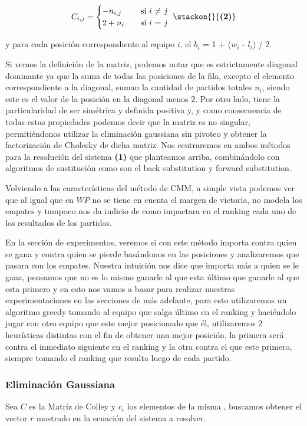 \[ C_{i,j} =
    \begin{cases}
        -n_{i,j}       & \quad \text{si }  \text{$i$ $\neq$ $j$} \\
        2+n_i & \quad \text{si } \text{$i$ $=$ $j$ }\\
    \end{cases}\hfill \stackon{}{\textbf{(2)}}
$$
  $$  \]
                    
y para cada posición correspondiente al equipo $i$, el $b_i$ = 1 +  ($w_i$ - $l_i$) / 2.

Si vemos la definición de la matriz, podemos notar que es estrictamente diagonal dominante ya que la suma de todas las posiciones de la fila, excepto el elemento correspondiente a la diagonal, suman la cantidad de partidos totales $n_i$, siendo este es el valor de la posición en la diagonal menos 2. 
Por otro lado, tiene la particularidad de ser simétrica y definida positiva y, y como consecuencia de todas estas propiedades podemos decir que la matriz es no singular, permitiéndonos utilizar la eliminación gaussiana sin pivoteo y obtener la factorización de Cholesky de dicha matriz.
Nos centraremos en ambos métodos para la resolución del sistema \textbf{}\textbf{(1)} que planteamos arriba, combinándolo con algoritmos de sustitución como son el back substitution y forward substitution.

Volviendo a las características del método de CMM, a simple vista podemos ver que al igual que en $WP$ no se tiene en cuenta el margen de victoria, no modela los empates y tampoco nos da indicio de como impactara en el ranking cada uno de los resultados de los partidos.

En la sección de experimentos, veremos si con este método importa contra quien se gana y contra quien se pierde basándonos en las posiciones y analizaremos que pasara con los empates. Nuestra intuición nos dice que importa más a quien se le gana, pensamos que no es lo mismo ganarle al que esta último que ganarle al que esta primero y en esto nos vamos a basar para realizar nuestras experimentaciones en las secciones de más adelante, para esto utilizaremos un algoritmo greedy tomando al equipo que salga último en el ranking y haciéndolo jugar con otro equipo que este mejor posicionado que él, utilizaremos 2 heurísticas distintas con el fin de obtener una mejor posición, la primera será contra el inmediato siguiente en el ranking y la otra contra el que este primero, siempre tomando el ranking que resulta luego de cada partido.

\subsubsection{Eliminación Gaussiana}
Sea $C$ es la Matriz de Colley y $c_i$ los elementos de la misma , buscamos obtener el vector $r$ mostrado en la ecuación del sistema a resolver. 

